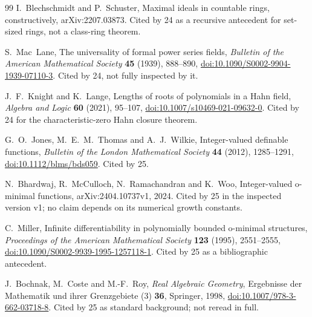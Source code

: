 \documentclass[11pt,letterpaper]{article}
\numberwithin{equation}{section}
\theoremstyle{definition}
\theoremstyle{remark}
\theoremstyle{plain}
\begin{document}
\begin{thebibliography}{99}
I.~Blechschmidt and P.~Schuster, Maximal ideals in countable rings, constructively, arXiv:2207.03873. Cited by 24 as a recursive antecedent for
set-sized rings, not a class-ring theorem.

S.~Mac~Lane, The universality of formal power series fields, \emph{Bulletin of the American Mathematical Society} \textbf{45} (1939), 888--890,
\href{https://doi.org/10.1090/S0002-9904-1939-07110-3}{doi:10.1090/S0002-9904-1939-07110-3}. Cited by 24, not fully inspected by it.

J.~F.~Knight and K.~Lange, Lengths of roots of polynomials in a Hahn field, \emph{Algebra and Logic} \textbf{60} (2021), 95--107,
\href{https://doi.org/10.1007/s10469-021-09632-0}{doi:10.1007/s10469-021-09632-0}. Cited by 24 for the characteristic-zero Hahn closure theorem.

G.~O.~Jones, M.~E.~M.~Thomas and A.~J.~Wilkie, Integer-valued definable functions, \emph{Bulletin of the London Mathematical Society} \textbf{44}
(2012), 1285--1291, \href{https://doi.org/10.1112/blms/bds059}{doi:10.1112/blms/bds059}. Cited by 25.

N.~Bhardwaj, R.~McCulloch, N.~Ramachandran and K.~Woo, Integer-valued o-minimal functions, arXiv:2404.10737v1, 2024. Cited by 25 in the
inspected version v1; no claim depends on its numerical growth constants.

C.~Miller, Infinite differentiability in polynomially bounded o-minimal structures, \emph{Proceedings of the American Mathematical Society}
\textbf{123} (1995), 2551--2555, \href{https://doi.org/10.1090/S0002-9939-1995-1257118-1}{doi:10.1090/S0002-9939-1995-1257118-1}. Cited by 25 as a
bibliographic antecedent.

J.~Bochnak, M.~Coste and M.-F.~Roy, \emph{Real Algebraic Geometry}, Ergebnisse der Mathematik und ihrer Grenzgebiete (3) \textbf{36}, Springer,
1998, \href{https://doi.org/10.1007/978-3-662-03718-8}{doi:10.1007/978-3-662-03718-8}. Cited by 25 as standard background; not reread in full.

\end{thebibliography}
\endgroup
\end{document}
